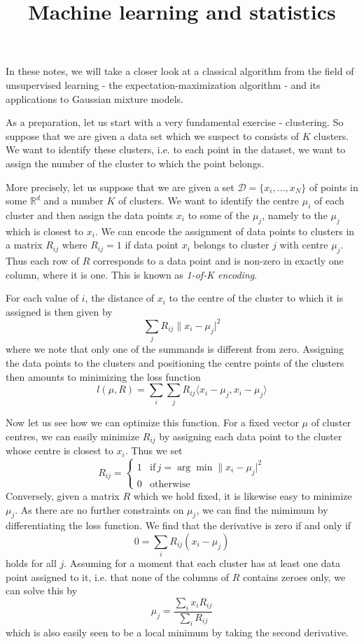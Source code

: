 \documentclass[a4paper, draft]{article}
\title{Machine learning and statistics}
\theoremstyle{own}
\theoremstyle{remark}
\newcommand{\R}{\mathbb{R}}
\begin{document}
\maketitle


In these notes, we will take a closer look at a classical algorithm from the field of unsupervised learning - the expectation-maximization algorithm - and its applications to Gaussian mixture models. 

As a preparation, let us start with a very fundamental exercise - clustering. So suppose that we are given a data set which we suspect to consists of $K$ clusters. We want to identify these clusters, i.e. to each point in the dataset, we want to assign the number of the cluster to which the point belongs. 

More precisely, let us suppose that we are given a set ${\mathcal D} = \{ x_i, \dots, x_N\}$ of points in some $\R^d$ and a number $K$ of clusters. We want to identify the centre $\mu_i$ of each cluster and then assign the data points $x_i$ to some of the $\mu_j$, namely to the $\mu_j$ which is closest to $x_i$. We can encode the assignment of data points to clusters in a matrix $R_{ij}$ where $R_{ij} = 1$ if data point $x_i$ belongs to cluster $j$ with centre $\mu_j$. Thus each row of $R$ corresponds to a data point and is non-zero in exactly one column, where it is one. This is known as {\em 1-of-K encoding}.

For each value of $i$, the distance of $x_i$ to the centre of the cluster to which it is assigned is then given by
$$
\sum_j R_{ij} \| x_i - \mu_j |^2
$$
where we note that only one of the summands is different from zero. Assigning the data points to the clusters and positioning the centre points of the clusters then amounts to minimizing the loss function
$$
l(\mu, R) = \sum_i \sum_j R_{ij} \langle x_i - \mu_j , x_i - \mu_j \rangle
$$

Now let us see how we can optimize this function. For a fixed vector $\mu$ of cluster centres, we can easily minimize $R_{ij}$ by assigning each data point to the cluster whose centre is closest to $x_i$. Thus we set
$$
R_{ij} = 
\begin{cases}
1 & \text{if} \, j = \arg \min \| x_i - \mu_j |^2 \\
0 & \text{otherwise}
\end{cases}
$$
Conversely, given a matrix $R$ which we hold fixed, it is likewise easy to minimize $\mu_j$. As there are no further constraints on $\mu_j$, we can find the mimimum by differentiating the loss function. We find that the derivative is zero if and only if
$$
0 = \sum_i R_{ij}(x_i - \mu_j)
$$
holds for all $j$. Assuming for a moment that each cluster has at least one data point assigned to it, i.e. that none of the columns of $R$ contains zeroes only, we can solve this by
$$
\mu_j = \frac{\sum_i x_i R_{ij}}{\sum_i R_{ij}}
$$
which is also easily seen to be a local minimum by taking the second derivative.
\end{document}
